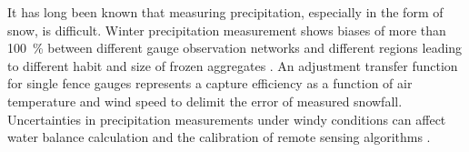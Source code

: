 
\par\medskip
\noindent
It has long been known that measuring precipitation, especially in the form of snow, is difficult. Winter precipitation measurement shows biases of more than \SI{100}{\percent} between different gauge observation networks and different regions leading to different habit and size of frozen aggregates \citep{kochendorfer_analysis_2017}. An adjustment transfer function for single fence gauges represents a capture efficiency as a function of air temperature and wind speed to delimit the error of measured snowfall.
Uncertainties in precipitation measurements under windy conditions can affect water balance calculation and the calibration of remote sensing algorithms \citep{wolff_derivation_2015}. 
\par\medskip
\noindent

